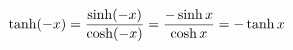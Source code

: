 \documentclass[preview]{standalone}
\begin{document}
\begin{align*}
\special{dvisvgm:raw <g id='unique000'>}\tanh(-x)=\frac{\sinh(-x)}{\cosh(-x)}=\frac{-\sinh x}{\cosh x}=-\tanh x\special{dvisvgm:raw </g>}
\end{align*}
\end{document}
